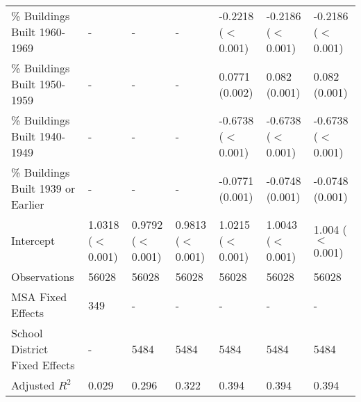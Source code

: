 \begin{table}[h]
\begin{tabular}{l|llllll}
\% Buildings Built 1960-1969 &- & - & - & -0.2218 ($<$0.001) & -0.2186 ($<$0.001) & -0.2186 ($<$0.001) \\
\% Buildings Built 1950-1959 &- & - & - & 0.0771 (0.002) & 0.082 (0.001) & 0.082 (0.001) \\
\% Buildings Built 1940-1949 &- & - & - & -0.6738 ($<$0.001) & -0.6738 ($<$0.001) & -0.6738 ($<$0.001) \\
\% Buildings Built 1939 or Earlier &- & - & - & -0.0771 (0.001) & -0.0748 (0.001) & -0.0748 (0.001) \\
Intercept &1.0318 ($<$0.001) & 0.9792 ($<$0.001) & 0.9813 ($<$0.001) & 1.0215 ($<$0.001) & 1.0043 ($<$0.001) & 1.004 ($<$0.001) \\
Observations &56028 & 56028 & 56028 & 56028 & 56028 & 56028 \\
MSA Fixed Effects &349 & - & - & - & - & - \\
School District Fixed Effects &- & 5484 & 5484 & 5484 & 5484 & 5484 \\
Adjusted $R^2$ &0.029 & 0.296 & 0.322 & 0.394 & 0.394 & 0.394 \\\hline
\end{tabular}
\end{table}

